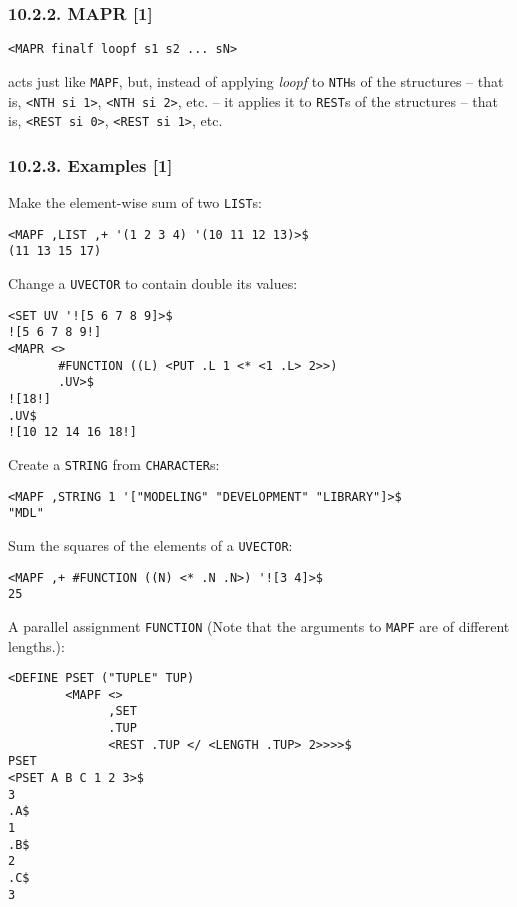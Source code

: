 \documentclass[a4paper,]{article}
\begin{document}
\subsubsection{10.2.2. MAPR {[}1{]}}\label{mapr-1}

\begin{verbatim}
<MAPR finalf loopf s1 s2 ... sN>
\end{verbatim}

 acts just like \texttt{MAPF}, but, instead of applying \emph{loopf} to \texttt{NTH}s of the
structures -- that is, \texttt{\textless{}NTH\ si\ 1\textgreater{}}, \texttt{\textless{}NTH\ si\ 2\textgreater{}}, etc. --
it applies it to \texttt{REST}s of the structures -- that is, \texttt{\textless{}REST\ si\ 0\textgreater{}},
\texttt{\textless{}REST\ si\ 1\textgreater{}}, etc.

\subsubsection{10.2.3. Examples {[}1{]}}\label{examples-1-3}

Make the element-wise sum of two \texttt{LIST}s:

\begin{verbatim}
<MAPF ,LIST ,+ '(1 2 3 4) '(10 11 12 13)>$
(11 13 15 17)
\end{verbatim}

Change a \texttt{UVECTOR} to contain double its values:

\begin{verbatim}
<SET UV '![5 6 7 8 9]>$
![5 6 7 8 9!]
<MAPR <>
       #FUNCTION ((L) <PUT .L 1 <* <1 .L> 2>>)
       .UV>$
![18!]
.UV$
![10 12 14 16 18!]
\end{verbatim}

Create a \texttt{STRING} from \texttt{CHARACTER}s:

\begin{verbatim}
<MAPF ,STRING 1 '["MODELING" "DEVELOPMENT" "LIBRARY"]>$
"MDL"
\end{verbatim}

Sum the squares of the elements of a \texttt{UVECTOR}:

\begin{verbatim}
<MAPF ,+ #FUNCTION ((N) <* .N .N>) '![3 4]>$
25
\end{verbatim}

A parallel assignment \texttt{FUNCTION} (Note that the arguments to \texttt{MAPF} are of different lengths.):

\begin{verbatim}
<DEFINE PSET ("TUPLE" TUP)
        <MAPF <>
              ,SET
              .TUP
              <REST .TUP </ <LENGTH .TUP> 2>>>>$
PSET
<PSET A B C 1 2 3>$
3
.A$
1
.B$
2
.C$
3
\end{verbatim}
\end{document}
